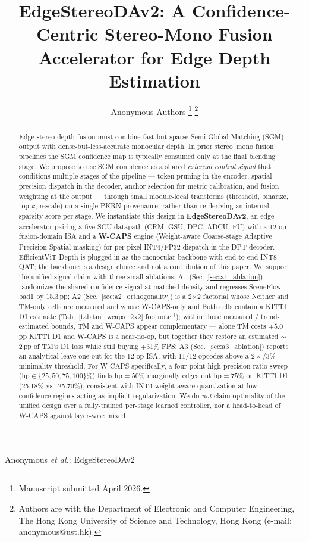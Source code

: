 \documentclass[journal]{IEEEtran}
\begin{document}
\title{EdgeStereoDAv2: A Confidence-Centric Stereo-Mono Fusion Accelerator for Edge Depth Estimation}

\author{Anonymous Authors
\thanks{Manuscript submitted April 2026.}
\thanks{Authors are with the Department of Electronic and Computer Engineering, The Hong Kong University of Science and Technology, Hong Kong (e-mail: anonymous@ust.hk).}
}

%
{Anonymous \MakeLowercase{\textit{et al.}}: EdgeStereoDAv2}

\maketitle

\begin{abstract}
Edge stereo depth fusion must combine fast-but-sparse Semi-Global Matching (SGM) output with dense-but-less-accurate monocular depth. In prior stereo--mono fusion pipelines the SGM confidence map is typically consumed only at the final blending stage. We propose to use SGM confidence as a shared \emph{external control signal} that conditions multiple stages of the pipeline --- token pruning in the encoder, spatial precision dispatch in the decoder, anchor selection for metric calibration, and fusion weighting at the output --- through small module-local transforms (threshold, binarize, top-$k$, rescale) on a single PKRN provenance, rather than re-deriving an internal sparsity score per stage. We instantiate this design in \textbf{EdgeStereoDAv2}, an edge accelerator pairing a five-SCU datapath (CRM, GSU, DPC, ADCU, FU) with a 12-op fusion-domain ISA and a \textbf{W-CAPS} engine (Weight-aware Coarse-stage Adaptive Precision Spatial masking) for per-pixel INT4/FP32 dispatch in the DPT decoder. EfficientViT-Depth is plugged in as the monocular backbone with end-to-end INT8 QAT; the backbone is a design choice and not a contribution of this paper. We support the unified-signal claim with three small ablations: A1 (Sec.~\ref{sec:a1_ablation}) randomizes the shared confidence signal at matched density and regresses SceneFlow bad1 by 15.3\,pp; A2 (Sec.~\ref{sec:a2_orthogonality}) is a 2$\times$2 factorial whose Neither and TM-only cells are measured and whose W-CAPS-only and Both cells contain a KITTI D1 estimate (Tab.~\ref{tab:tm_wcaps_2x2} footnote $^\ddagger$); within those measured / trend-estimated bounds, TM and W-CAPS appear complementary --- alone TM costs $+5.0$\,pp KITTI D1 and W-CAPS is a near-no-op, but together they restore an estimated $\sim$2\,pp of TM's D1 loss while still buying $+31\%$ FPS; A3 (Sec.~\ref{sec:a3_ablation}) reports an analytical leave-one-out for the 12-op ISA, with 11/12 opcodes above a $2{\times}$/$3\%$ minimality threshold. For W-CAPS specifically, a four-point high-precision-ratio sweep (hp$\in\{25,50,75,100\}\%$) finds hp$=50\%$ marginally edges out hp$=75\%$ on KITTI D1 (25.18\% vs.\ 25.70\%), consistent with INT4 weight-aware quantization at low-confidence regions acting as implicit regularization. We do \emph{not} claim optimality of the unified design over a fully-trained per-stage learned controller, nor a head-to-head of W-CAPS against layer-wise mixed 
\end{abstract}
\end{document}
